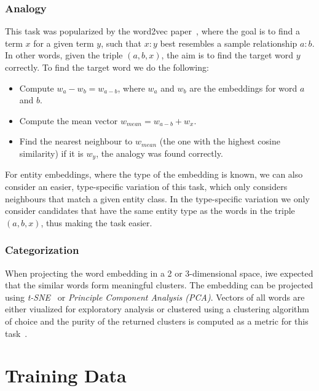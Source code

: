 \subsubsection{Analogy}
This task was popularized by the word2vec paper~\cite{DBLP:journals/corr/abs-1301-3781}, where the goal is to find a term $x$ for a given term $y$, such that  $x : y$ best resembles a sample relationship $a : b$. In other words, given the triple $(a,b,x)$, the aim is to find the target word $y$ correctly. To find the target word we do the following:  
\begin{itemize}
    \item Compute $w_a-w_b=w_{a-b}$, where $w_a$ and $w_b$ are the embeddings for word $a$ and $b$. 
    \item  Compute the mean vector $w_{mean}=w_{a-b}+w_x$.
    \item  Find the nearest neighbour to $w_{mean}$ (the one with the highest cosine similarity) if it is $w_y$, the analogy was found correctly.
  \end{itemize}
  \noindent
For entity embeddings, where the type of the embedding is known, we can also consider an easier, type-specific variation of this task, which only considers neighbours that match a given entity class. In the type-specific variation we only consider candidates that have the same entity type as the words in the triple $(a,b,x)$, thus making the task easier. 
\subsubsection{Categorization}
When projecting the word embedding in a 2 or 3-dimensional space, iwe expected that the similar words form meaningful clusters. The embedding can be projected using \emph{t-SNE}~\cite{SCHOL:journals/jmlr/Maaten} or \emph{Principle Component Analysis (PCA)}. Vectors of all words are either viualized for exploratory analysis or clustered using a clustering algorithm of choice and the purity of the returned clusters is computed as a metric for this task~. 

\section{Training Data}\label{sec:data}

